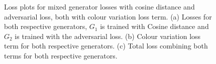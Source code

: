   \begin{figure}[!htbp]
    \centering
    \hfill
    \hfill
    \caption[Loss plots for mixed generator losses with cosine distance and adversarial loss, both with colour variation loss term]{Loss plots for mixed generator losses with cosine distance and adversarial loss, both with colour variation loss term. (a) Losses for both respective generators, $G_{1}$ is trained with Cosine distance and $G_{2}$ is trained with the adversarial loss. (b) Colour variation loss term for both respective generators. (c) Total loss combining both terms for both respective generators. }
    \label{fig:c3:cosine-adv-losses}
  \end{figure}

  \FloatBarrier

